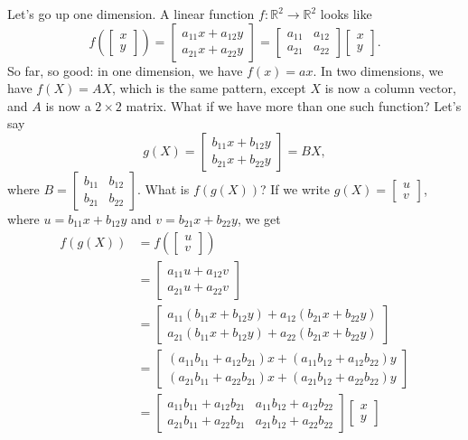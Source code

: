 \documentclass[letterpaper,12pt]{article}
\newcommand{\R}{\mathbb{R}}
\begin{document}
Let's go up one dimension. A linear function $f:\R^2\to \R^2$ looks like
\[
 f\left(\begin{bmatrix}x\\y\end{bmatrix}\right) = \begin{bmatrix}a_{11}x+a_{12}y\\a_{21}x+a_{22}y\end{bmatrix} = \begin{bmatrix}a_{11}&a_{12}\\a_{21}&a_{22}\end{bmatrix}\begin{bmatrix}x\\y\end{bmatrix}.
\]
So far, so good: in one dimension, we have $f(x)=ax$. In two dimensions, we have $f(X)=AX$, which is the same pattern, except $X$ is now a column vector, and $A$ is now a $2\times 2$ matrix. What if we have more than one such function? Let's say 
\[
g(X) = \begin{bmatrix}b_{11}x+b_{12}y\\b_{21}x+b_{22}y\end{bmatrix} = BX, 
\]
where $B = \begin{bmatrix}b_{11}&b_{12}\\b_{21}&b_{22}\end{bmatrix}$. What is $f(g(X))$? If we write $g(X) = \begin{bmatrix}u\\v\end{bmatrix}$, where $u=b_{11}x+b_{12}y$ and $v=b_{21}x+b_{22}y$, we get
\begin{align*}
 f(g(X)) &= f\left(\begin{bmatrix}u\\v\end{bmatrix}\right)\\
& = \begin{bmatrix}a_{11}u+a_{12}v\\a_{21}u+a_{22}v\end{bmatrix}\\
& = \begin{bmatrix}a_{11}(b_{11}x+b_{12}y)+a_{12}(b_{21}x+b_{22}y)\\a_{21}(b_{11}x+b_{12}y)+a_{22}(b_{21}x+b_{22}y)\end{bmatrix}\\
& = \begin{bmatrix}(a_{11}b_{11}+a_{12}b_{21})x+(a_{11}b_{12}+a_{12}b_{22})y\\(a_{21}b_{11}+a_{22}b_{21})x+(a_{21}b_{12}+a_{22}b_{22})y\end{bmatrix}\\
& = \begin{bmatrix}a_{11}b_{11}+a_{12}b_{21} & a_{11}b_{12}+a_{12}b_{22}\\a_{21}b_{11}+a_{22}b_{21}& a_{21}b_{12}+a_{22}b_{22}\end{bmatrix}\begin{bmatrix}x\\y\end{bmatrix}
\end{align*}
\end{document}
